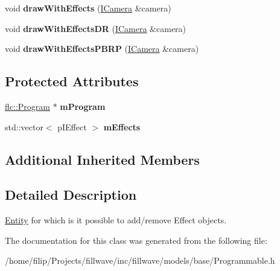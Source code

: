 \begin{DoxyCompactItemize}
\item 
void {\bfseries draw\+With\+Effects} (\hyperlink{classflw_1_1flf_1_1ICamera}{I\+Camera} \&camera)\hypertarget{classflw_1_1flf_1_1Programmable_a4a0b0364f2bc52f8c72afdb56a329f01}{}\label{classflw_1_1flf_1_1Programmable_a4a0b0364f2bc52f8c72afdb56a329f01}

\item 
void {\bfseries draw\+With\+Effects\+DR} (\hyperlink{classflw_1_1flf_1_1ICamera}{I\+Camera} \&camera)\hypertarget{classflw_1_1flf_1_1Programmable_aed374df6b76281b34242eb07989928e1}{}\label{classflw_1_1flf_1_1Programmable_aed374df6b76281b34242eb07989928e1}

\item 
void {\bfseries draw\+With\+Effects\+P\+B\+RP} (\hyperlink{classflw_1_1flf_1_1ICamera}{I\+Camera} \&camera)\hypertarget{classflw_1_1flf_1_1Programmable_afa8791efd275db35a705676140b1449d}{}\label{classflw_1_1flf_1_1Programmable_afa8791efd275db35a705676140b1449d}

\end{DoxyCompactItemize}
\subsection*{Protected Attributes}
\begin{DoxyCompactItemize}
\item 
\hyperlink{classflw_1_1flc_1_1Program}{flc\+::\+Program} $\ast$ {\bfseries m\+Program}\hypertarget{classflw_1_1flf_1_1Programmable_af07ba7892fa638885dc4faab7f020f96}{}\label{classflw_1_1flf_1_1Programmable_af07ba7892fa638885dc4faab7f020f96}

\item 
std\+::vector$<$ p\+I\+Effect $>$ {\bfseries m\+Effects}\hypertarget{classflw_1_1flf_1_1Programmable_ad5e862d4f5edd026874ad70d1f32b9b3}{}\label{classflw_1_1flf_1_1Programmable_ad5e862d4f5edd026874ad70d1f32b9b3}

\end{DoxyCompactItemize}
\subsection*{Additional Inherited Members}


\subsection{Detailed Description}
\hyperlink{classflw_1_1flf_1_1Entity}{Entity} for which is it possible to add/remove Effect objects. 

The documentation for this class was generated from the following file\+:\begin{DoxyCompactItemize}
\item 
/home/filip/\+Projects/fillwave/inc/fillwave/models/base/Programmable.\+h\end{DoxyCompactItemize}
